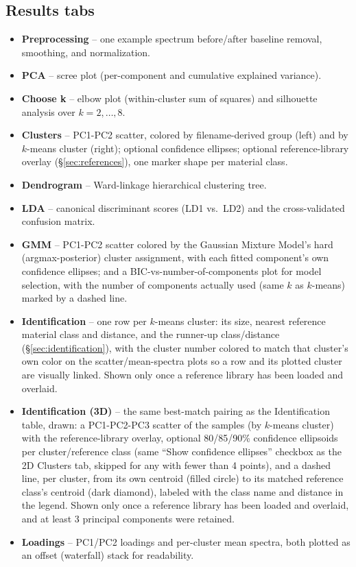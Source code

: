 \documentclass[11pt,a4paper]{article}
\begin{document}
\subsection{Results tabs}
\begin{itemize}
  \item \textbf{Preprocessing} -- one example spectrum before/after
  baseline removal, smoothing, and normalization.
  \item \textbf{PCA} -- scree plot (per-component and cumulative explained
  variance).
  \item \textbf{Choose k} -- elbow plot (within-cluster sum of squares) and
  silhouette analysis over $k=2,\dots,8$.
  \item \textbf{Clusters} -- PC1-PC2 scatter, colored by filename-derived
  group (left) and by $k$-means cluster (right); optional confidence
  ellipses; optional reference-library overlay (\S\ref{sec:references}),
  one marker shape per material class.
  \item \textbf{Dendrogram} -- Ward-linkage hierarchical clustering tree.
  \item \textbf{LDA} -- canonical discriminant scores (LD1 vs.\ LD2) and
  the cross-validated confusion matrix.
  \item \textbf{GMM} -- PC1-PC2 scatter colored by the Gaussian Mixture
  Model's hard (argmax-posterior) cluster assignment, with each fitted
  component's own confidence ellipses; and a BIC-vs-number-of-components
  plot for model selection, with the number of components actually used
  (same $k$ as $k$-means) marked by a dashed line.
  \item \textbf{Identification} -- one row per $k$-means cluster: its
  size, nearest reference material class and distance, and the runner-up
  class/distance (\S\ref{sec:identification}), with the cluster number
  colored to match that cluster's own color on the scatter/mean-spectra
  plots so a row and its plotted cluster are visually linked. Shown only
  once a reference library has been loaded and overlaid.
  \item \textbf{Identification (3D)} -- the same best-match pairing as the
  Identification table, drawn: a PC1-PC2-PC3 scatter of the samples (by
  $k$-means cluster) with the reference-library overlay, optional
  80/85/90\% confidence ellipsoids per cluster/reference class (same
  ``Show confidence ellipses'' checkbox as the 2D Clusters tab, skipped
  for any with fewer than 4 points), and a dashed line, per cluster, from
  its own centroid (filled circle) to its matched reference class's
  centroid (dark diamond), labeled with the class name and distance in
  the legend. Shown only once a reference library has been loaded and
  overlaid, and at least 3 principal components were retained.
  \item \textbf{Loadings} -- PC1/PC2 loadings and per-cluster mean spectra,
  both plotted as an offset (waterfall) stack for readability.
\end{itemize}
\end{document}
